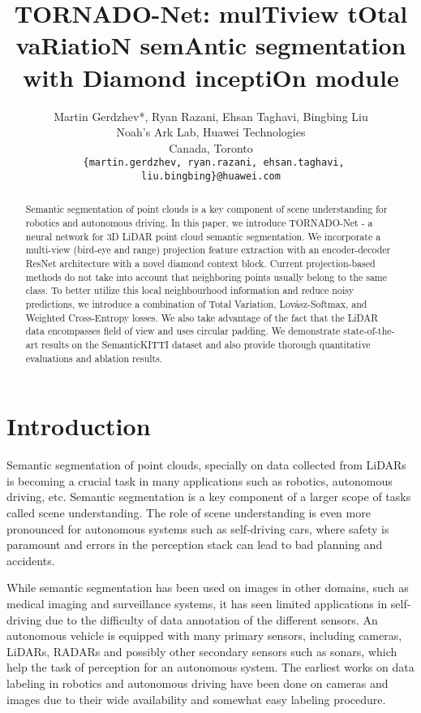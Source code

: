 \documentclass{article}
\date{}
\title{TORNADO-Net: mulTiview tOtal vaRiatioN semAntic segmentation with Diamond inceptiOn module}
\author{
  Martin Gerdzhev*, Ryan Razani, Ehsan Taghavi, Bingbing Liu\\
  Noah's Ark Lab, Huawei Technologies\\
  Canada, Toronto\\
  \texttt{ \{martin.gerdzhev, ryan.razani, ehsan.taghavi, liu.bingbing\}@huawei.com} \\
}
\begin{document}
\maketitle




\begin{abstract}
    Semantic segmentation of point clouds is a key component of scene understanding for robotics and autonomous driving. In this paper, we introduce TORNADO-Net - a neural network for 3D LiDAR point cloud semantic segmentation. We incorporate a multi-view (bird-eye and range) projection feature extraction with an encoder-decoder ResNet architecture with a novel diamond context block. Current projection-based methods do not take into account that neighboring points usually belong to the same class. To better utilize this local neighbourhood information and reduce noisy predictions, we introduce a combination of Total Variation, Lov\'asz-Softmax, and Weighted Cross-Entropy losses. We also take advantage of the fact that the LiDAR data encompasses  field of view and uses circular padding. We demonstrate state-of-the-art results on the SemanticKITTI dataset and also provide thorough quantitative evaluations and ablation results. 
\end{abstract}











\section{Introduction}
    	



Semantic segmentation of point clouds, specially on data collected from LiDARs is becoming a crucial task in many applications such as robotics, autonomous driving, etc.  Semantic segmentation is a key component of a larger scope of tasks called scene understanding. The role of scene understanding is even more pronounced for autonomous systems such as self-driving cars, where safety is paramount and errors in the perception stack can lead to bad planning and accidents.

While semantic segmentation has been used on images in other domains, such as medical imaging and surveillance systems, it has seen limited applications in self-driving due to the difficulty of data annotation of the different sensors. An autonomous vehicle is equipped with many primary sensors, including cameras, LiDARs, RADARs and possibly other secondary sensors such as sonars, which help the task of perception for an autonomous system. The earliest works on data labeling in robotics and autonomous driving have been done on cameras and images due to their wide availability and somewhat easy labeling procedure. 
\end{document}
